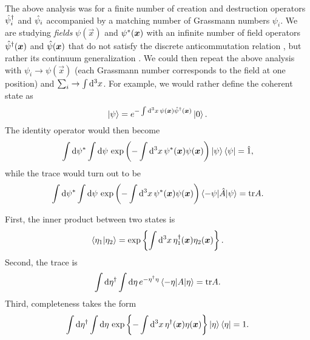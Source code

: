 The above analysis was for a finite number of creation and destruction operators $\hat\psi^\dagger_i$ and $\hat\psi_i$ accompanied by a matching number of Grassmann numbers $\psi_i$.
We are studying \emph{fields} $\psi(\vec{x})$ and ${\psi}^*({\bm{x}})$ with an infinite number of field operators $\hat\psi^\dagger({\bm{x}})$ and $\hat\psi({\bm{x}})$ that do not satisfy the discrete anticommutation relation , but rather its continuum generalization .
We could then repeat the above analysis with $\psi_i \rightarrow \psi(\vec{x})$ (each Grassmann number corresponds to the field at one position) and $\sum_i \rightarrow \int \mathop{}\!\mathrm{d}^3 x$.
For example, we would rather define the coherent state as
\begin{equation}
	\ket{\psi} = e^{-\int \mathop{}\!\mathrm{d}^3 x\, \psi({\bm{x}}) \hat\psi^\dagger({\bm{x}})} \ket{0} .
\end{equation}
The identity operator would then become
\begin{equation}
	\int \mathop{}\!\mathrm{d} {\psi}^* \int \mathop{}\!\mathrm{d} \psi \, \exp \left( -\int \mathop{}\!\mathrm{d}^3 x \, {\psi}^*({\bm{x}}) \psi({\bm{x}}) \right) \ket{\psi} \bra{\psi} = \hat{1} ,
\end{equation}
while the trace would turn out to be
\begin{equation}
	\int \mathop{}\!\mathrm{d} {\psi}^* \int \mathop{}\!\mathrm{d} \psi \, \exp \left( -\int \mathop{}\!\mathrm{d}^3 x \, {\psi}^*({\bm{x}}) \psi({\bm{x}}) \right) \braket{-\psi | \hat{A} | \psi} = \text{tr} A .
\end{equation}

First, the inner product between two states is
\begin{equation}
	\braket{\eta_1 | \eta_2} = \exp \left\{ \int \mathop{}\!\mathrm{d}^3 x \, \eta_1^\dagger({\bm{x}}) \eta_2({\bm{x}}) \right\} .
\label{eq:tft:grassmann_inner_product}
\end{equation}
Second, the trace is 
\begin{equation}
	\int \mathop{}\!\mathrm{d} \eta^\dagger \int \mathop{}\!\mathrm{d} \eta \, e^{-\eta^\dagger \eta} \braket{-\eta | A | \eta} = \text{tr} A .
\label{eq:tft:trace_grassmann}
\end{equation}
Third, completeness takes the form
\begin{equation}
	\int \mathop{}\!\mathrm{d} \eta^\dagger \int \mathop{}\!\mathrm{d} \eta \, \exp \left\{-\int \mathop{}\!\mathrm{d}^3 x \, \eta^\dagger({\bm{x}}) \eta({\bm{x}}) \right\} \ket{\eta} \bra{\eta} = 1 .
\label{eq:tft:completeness_grassmann}
\end{equation}

